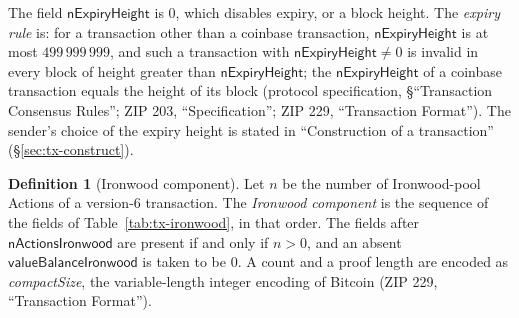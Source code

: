 \documentclass[11pt,a4paper]{article}
\theoremstyle{definition}
\newtheorem{definition}[theorem]{Definition}
\begin{document}
The field $\mathsf{nExpiryHeight}$ is $0$, which disables expiry, or a block
height. The \emph{expiry rule} is: for a transaction other than a coinbase
transaction, $\mathsf{nExpiryHeight}$ is at most $499\,999\,999$, and such a
transaction with $\mathsf{nExpiryHeight} \neq 0$ is invalid in every block
of height greater than $\mathsf{nExpiryHeight}$; the
$\mathsf{nExpiryHeight}$ of a coinbase transaction equals the height of its
block (protocol specification, \S``Transaction Consensus Rules''; ZIP 203,
``Specification''; ZIP 229, ``Transaction Format''). The sender's choice of
the expiry height is stated in ``Construction of a transaction''
(\S\ref{sec:tx-construct}).

\begin{definition}[Ironwood component]
Let $n$ be the number of Ironwood-pool Actions of a version-$6$
transaction. The \emph{Ironwood component} is the sequence of the fields of
Table~\ref{tab:tx-ironwood}, in that order. The fields after
$\mathsf{nActionsIronwood}$ are present if and only if $n > 0$, and an
absent $\mathsf{valueBalanceIronwood}$ is taken to be $0$. A count and a
proof length are encoded as \emph{compactSize}, the variable-length integer
encoding of Bitcoin (ZIP 229, ``Transaction Format'').
\end{definition}
\end{document}

